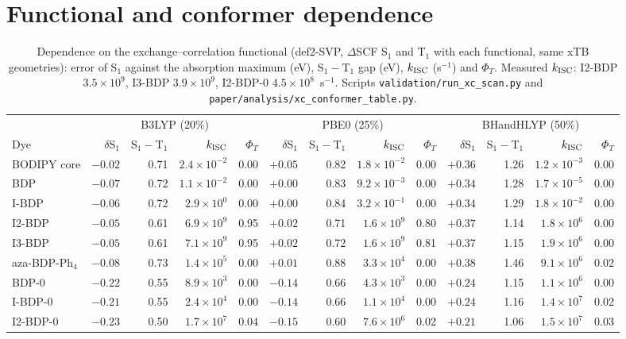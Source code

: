 \section{Functional and conformer dependence}
\begin{table}
  \caption{Dependence on the exchange--correlation functional (def2-SVP, $\Delta$SCF S$_1$ and T$_1$ with each
  functional, same xTB geometries): error of S$_1$ against the absorption maximum (eV), S$_1-$T$_1$ gap (eV),
  $k_\mathrm{ISC}$ (s$^{-1}$) and $\Phi_T$. Measured $k_\mathrm{ISC}$: I2-BDP $3.5\times10^{9}$, I3-BDP $3.9\times10^{9}$,
  I2-BDP-0 $4.5\times10^{8}$~s$^{-1}$. Scripts \texttt{validation/run\_xc\_scan.py} and
  \texttt{paper/analysis/xc\_conformer\_table.py}.}
  \label{tab:xc}
  \scriptsize\setlength{\tabcolsep}{2pt}
  \begin{tabular}{lrrrrrrrrrrrr}
    \toprule
    & \multicolumn{4}{c}{B3LYP (20\%)} & \multicolumn{4}{c}{PBE0 (25\%)} & \multicolumn{4}{c}{BHandHLYP (50\%)} \\
    Dye & $\delta$S$_1$ & S$_1-$T$_1$ & $k_\mathrm{ISC}$ & $\Phi_T$ & $\delta$S$_1$ & S$_1-$T$_1$ & $k_\mathrm{ISC}$ & $\Phi_T$ & $\delta$S$_1$ & S$_1-$T$_1$ & $k_\mathrm{ISC}$ & $\Phi_T$ \\
    \midrule
    BODIPY core & $-0.02$ & 0.71 & $2.4\times10^{-2}$ & 0.00 & $+0.05$ & 0.82 & $1.8\times10^{-2}$ & 0.00 & $+0.36$ & 1.26 & $1.2\times10^{-3}$ & 0.00 \\
    BDP & $-0.07$ & 0.72 & $1.1\times10^{-2}$ & 0.00 & $+0.00$ & 0.83 & $9.2\times10^{-3}$ & 0.00 & $+0.34$ & 1.28 & $1.7\times10^{-5}$ & 0.00 \\
    I-BDP & $-0.06$ & 0.72 & $2.9\times10^{0}$ & 0.00 & $+0.00$ & 0.84 & $3.2\times10^{-1}$ & 0.00 & $+0.34$ & 1.29 & $1.8\times10^{-2}$ & 0.00 \\
    I2-BDP & $-0.05$ & 0.61 & $6.9\times10^{9}$ & 0.95 & $+0.02$ & 0.71 & $1.6\times10^{9}$ & 0.80 & $+0.37$ & 1.14 & $1.8\times10^{6}$ & 0.00 \\
    I3-BDP & $-0.05$ & 0.61 & $7.1\times10^{9}$ & 0.95 & $+0.02$ & 0.72 & $1.6\times10^{9}$ & 0.81 & $+0.37$ & 1.15 & $1.9\times10^{6}$ & 0.00 \\
    aza-BDP-Ph$_4$ & $-0.08$ & 0.73 & $1.4\times10^{5}$ & 0.00 & $+0.01$ & 0.88 & $3.3\times10^{4}$ & 0.00 & $+0.38$ & 1.46 & $9.1\times10^{6}$ & 0.02 \\
    BDP-0 & $-0.22$ & 0.55 & $8.9\times10^{3}$ & 0.00 & $-0.14$ & 0.66 & $4.3\times10^{3}$ & 0.00 & $+0.24$ & 1.15 & $1.1\times10^{6}$ & 0.00 \\
    I-BDP-0 & $-0.21$ & 0.55 & $2.4\times10^{4}$ & 0.00 & $-0.14$ & 0.66 & $1.1\times10^{4}$ & 0.00 & $+0.24$ & 1.16 & $1.4\times10^{7}$ & 0.02 \\
    I2-BDP-0 & $-0.23$ & 0.50 & $1.7\times10^{7}$ & 0.04 & $-0.15$ & 0.60 & $7.6\times10^{6}$ & 0.02 & $+0.21$ & 1.06 & $1.5\times10^{7}$ & 0.03 \\
    \bottomrule
  \end{tabular}
\end{table}

